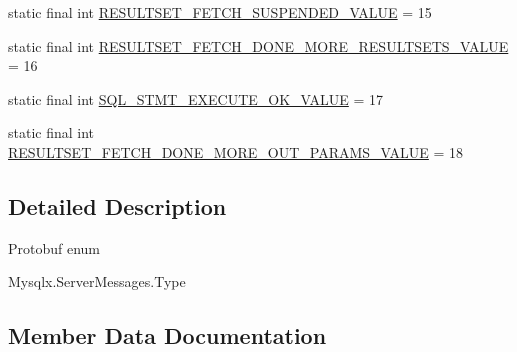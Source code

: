 \begin{DoxyCompactItemize}
\item 
static final int \mbox{\hyperlink{enumcom_1_1mysql_1_1cj_1_1x_1_1protobuf_1_1_mysqlx_1_1_server_messages_1_1_type_af1b8d750f8d68d103553b71b028e2c6d}{R\+E\+S\+U\+L\+T\+S\+E\+T\+\_\+\+F\+E\+T\+C\+H\+\_\+\+S\+U\+S\+P\+E\+N\+D\+E\+D\+\_\+\+V\+A\+L\+UE}} = 15
\item 
static final int \mbox{\hyperlink{enumcom_1_1mysql_1_1cj_1_1x_1_1protobuf_1_1_mysqlx_1_1_server_messages_1_1_type_ada9373c326931255bdc226e2bc518a38}{R\+E\+S\+U\+L\+T\+S\+E\+T\+\_\+\+F\+E\+T\+C\+H\+\_\+\+D\+O\+N\+E\+\_\+\+M\+O\+R\+E\+\_\+\+R\+E\+S\+U\+L\+T\+S\+E\+T\+S\+\_\+\+V\+A\+L\+UE}} = 16
\item 
static final int \mbox{\hyperlink{enumcom_1_1mysql_1_1cj_1_1x_1_1protobuf_1_1_mysqlx_1_1_server_messages_1_1_type_a3453ef2f3a221063a09242e4e6157352}{S\+Q\+L\+\_\+\+S\+T\+M\+T\+\_\+\+E\+X\+E\+C\+U\+T\+E\+\_\+\+O\+K\+\_\+\+V\+A\+L\+UE}} = 17
\item 
static final int \mbox{\hyperlink{enumcom_1_1mysql_1_1cj_1_1x_1_1protobuf_1_1_mysqlx_1_1_server_messages_1_1_type_aeda6f4c76f96be07b406d974e813bea3}{R\+E\+S\+U\+L\+T\+S\+E\+T\+\_\+\+F\+E\+T\+C\+H\+\_\+\+D\+O\+N\+E\+\_\+\+M\+O\+R\+E\+\_\+\+O\+U\+T\+\_\+\+P\+A\+R\+A\+M\+S\+\_\+\+V\+A\+L\+UE}} = 18
\end{DoxyCompactItemize}


\subsection{Detailed Description}
Protobuf enum
\begin{DoxyCode}
Mysqlx.ServerMessages.Type 
\end{DoxyCode}
 

\subsection{Member Data Documentation}
\mbox{\label{enumcom_1_1mysql_1_1cj_1_1x_1_1protobuf_1_1_mysqlx_1_1_server_messages_1_1_type_ac66559d24e178970e502f2366d3da841}} 
